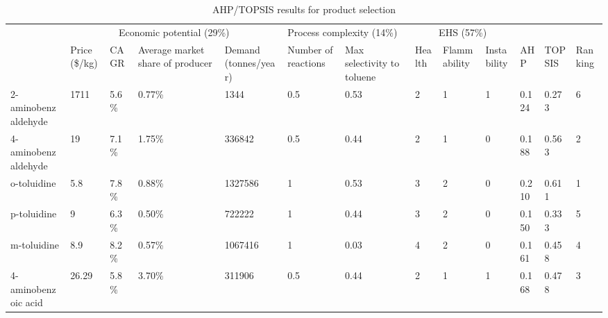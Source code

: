 \begin{table}[H]
\centering
    \caption{AHP/TOPSIS results for product selection}
    \label{tab:product}\small
\begin{tabularx}{\linewidth}{l|XXXX|XX|XXX|X|X|X|}
\toprule
                                          & \multicolumn{4}{c}{Economic potential   (29\%)}                                & \multicolumn{2}{p{2cm}}{Process   complexity (14\%)} & \multicolumn{3}{c}{EHS (57\%)}     &                       &                          &                           \\ \cline{2-10}
                                          & Price (\$/kg) & CAGR  & Average market share of producer & Demand (tonnes/year) & Number of reactions & Max selectivity to toluene & Health & Flammability & Instability & \multirow{-2}{*}{AHP} & \multirow{-2}{*}{TOPSIS} & \multirow{-2}{*}{Ranking} \\ \hline
2-aminobenzaldehyde} & 1711          & 5.6\% & 0.77\%                           & 1344                 & 0.5                 & 0.53                       & 2      & 1            & 1           & 0.124                 & 0.273                    & 6                         \\ \hline
4-aminobenzaldehyde} & 19            & 7.1\% & 1.75\%                           & 336842               & 0.5                 & 0.44                       & 2      & 1            & 0           & 0.188                 & 0.563                    & \cellcolor[HTML]{9AFF99}2 \\ \hline
o-toluidine}         & 5.8           & 7.8\% & 0.88\%                           & 1327586              & 1                   & 0.53                       & 3      & 2            & 0           & 0.210                 & 0.611                    & \cellcolor[HTML]{9AFF99}1 \\ \hline
p-toluidine}         & 9             & 6.3\% & 0.50\%                           & 722222               & 1                   & 0.44                       & 3      & 2            & 0           & 0.150                 & 0.333                    & 5                         \\ \hline
m-toluidine}         & 8.9           & 8.2\% & 0.57\%                           & 1067416              & 1                   & 0.03                       & 4      & 2            & 0           & 0.161                 & 0.458                    & 4                         \\ \hline
4-aminobenzoic acid} & 26.29         & 5.8\% & 3.70\%                           & 311906               & 0.5                 & 0.44                       & 2      & 1            & 1           & 0.168                 & 0.478                    & \cellcolor[HTML]{9AFF99}3 \\ \bottomrule
\end{tabularx}
\end{table}

